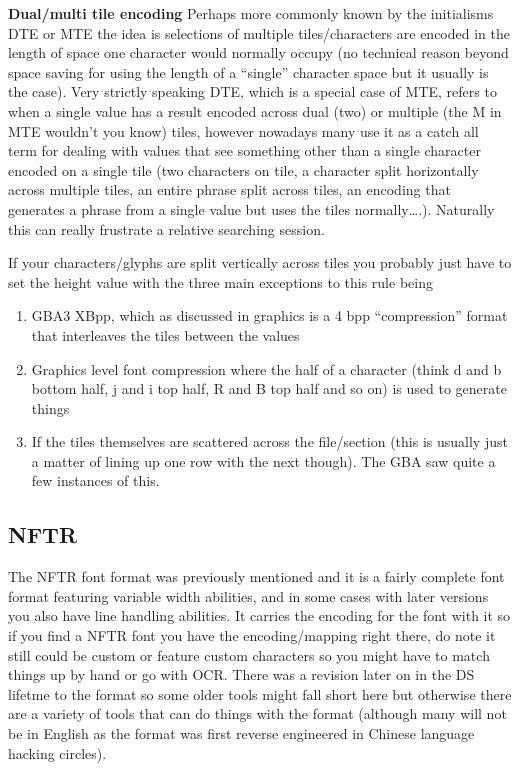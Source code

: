 \documentclass[
]{book}
\providecommand{\tightlist}{%
  \setlength{\itemsep}{0pt}\setlength{\parskip}{0pt}}
\begin{document}
\textbf{Dual/multi tile encoding} Perhaps more commonly known by the initialisms DTE or MTE the idea is selections of multiple tiles/characters are encoded in the length of space one character would normally occupy (no technical reason beyond space saving for using the length of a ``single'' character space but it usually is the case). Very strictly speaking DTE, which is a special case of MTE, refers to when a single value has a result encoded across dual (two) or multiple (the M in MTE wouldn't you know) tiles, however nowadays many use it as a catch all term for dealing with values that see something other than a single character encoded on a single tile (two characters on tile, a character split horizontally across multiple tiles, an entire phrase split across tiles, an encoding that generates a phrase from a single value but uses the tiles normally\ldots.). Naturally this can really frustrate a relative searching session.

If your characters/glyphs are split vertically across tiles you probably just have to set the height value with the three main exceptions to this rule being

\begin{enumerate}
\def\labelenumi{\arabic{enumi}.}
\tightlist
\item
  GBA3 XBpp, which as discussed in graphics is a 4 bpp ``compression'' format that interleaves the tiles between the values
\item
  Graphics level font compression where the half of a character (think d and b bottom half, j and i top half, R and B top half and so on) is used to generate things
\item
  If the tiles themselves are scattered across the file/section (this is usually just a matter of lining up one row with the next though). The GBA saw quite a few instances of this.
\end{enumerate}

\hypertarget{nftr}{%
\subsection{NFTR}\label{nftr}}

The NFTR font format was previously mentioned and it is a fairly complete font format featuring variable width abilities, and in some cases with later versions you also have line handling abilities. It carries the encoding for the font with it so if you find a NFTR font you have the encoding/mapping right there, do note it still could be custom or feature custom characters so you might have to match things up by hand or go with OCR. There was a revision later on in the DS lifetme to the format so some older tools might fall short here but otherwise there are a variety of tools that can do things with the format (although many will not be in English as the format was first reverse engineered in Chinese language hacking circles).
\end{document}
